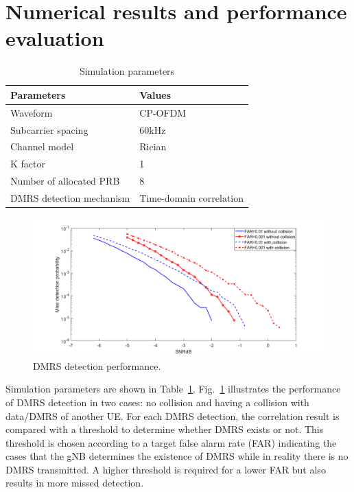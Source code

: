 \documentclass[conference]{IEEEtran}
\begin{document}
\section{Numerical results and performance evaluation}\label{III}

\begin{table}[htbp]
\caption{Simulation parameters}
\begin{center}
\begin{tabular}{|p{8em}|p{8em}|}
 \hline
 \textbf{Parameters} & \textbf{Values}\\
 \hline
 Waveform & CP-OFDM\\
 \hline
 Subcarrier spacing & 60kHz\\
 \hline
 Channel model & Rician\\
 \hline
 K factor & 1\\
 \hline
 Number of allocated PRB & 8\\
 \hline
 DMRS detection mechanism & Time-domain correlation\\
 

 
 \hline
\end{tabular}
\label{tab1}
\end{center}
\end{table}

\begin{figure}[htbp]
\centerline{\includegraphics[scale=0.22]{fig5.png}}
\caption{DMRS detection performance.}
\label{fig5}
\end{figure}

Simulation parameters are shown in Table~\ref{tab1}. Fig.~\ref{fig5} illustrates the performance of DMRS detection in two cases: no collision and having a collision with data/DMRS of another UE. For each DMRS detection, the correlation result is compared with a threshold to determine whether DMRS exists or not. This threshold is chosen according to a target false alarm rate (FAR) indicating the cases that the gNB determines the existence of DMRS while in reality there is no DMRS transmitted. A higher threshold is required for a lower FAR but also results in more missed detection.
\end{document}

